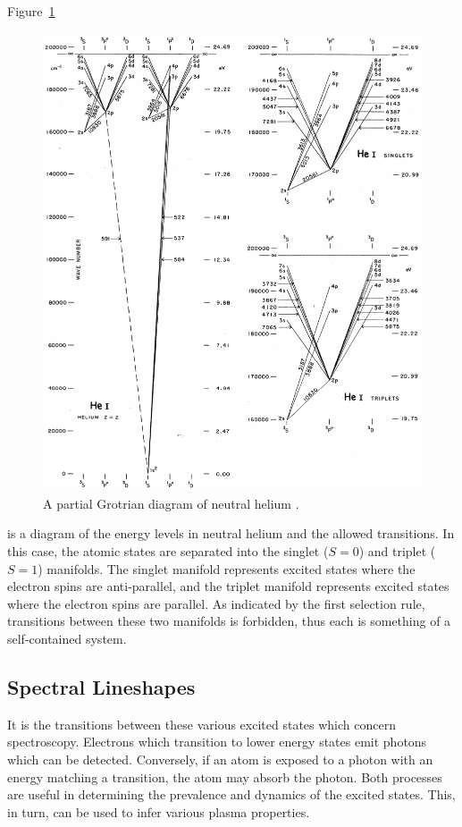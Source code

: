 {Figure~\ref{fig:grotrian}
\begin{figure}
  \centering
  \includegraphics{./chapters/theory/figures/grotrian.pdf}
  \caption{A partial Grotrian diagram of neutral helium \cite{Moore1968}.}
  \label{fig:grotrian}
\end{figure}
is a diagram of the energy levels in neutral helium and the allowed transitions.
In this case, the atomic states are separated into the singlet ($S=0$) and
triplet ($S = 1$) manifolds. The singlet manifold represents excited states
where the electron spins are anti-parallel, and the triplet manifold represents
excited states where the electron spins are parallel. As indicated by the first
selection rule, transitions between these two manifolds is forbidden, thus each
is something of a self-contained system.

\subsection{Spectral Lineshapes}

It is the transitions between these various excited states which concern
spectroscopy. Electrons which transition to lower energy states emit photons
which can be detected. Conversely, if an atom is exposed to a photon with an
energy matching a transition, the atom may absorb the photon. Both processes are
useful in determining the prevalence and dynamics of the excited states. This,
in turn, can be used to infer various plasma properties.

}
